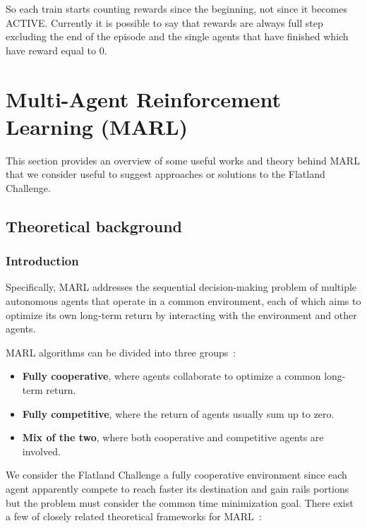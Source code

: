 \documentclass[11pt, a4paper, hidelinks]{report}
\begin{document}
So each train starts counting rewards since the beginning, not since it becomes ACTIVE\@.
Currently it is possible to say that rewards are always full step excluding the end of the episode and the single agents that have finished which have reward equal to 0.

\chapter{Multi-Agent Reinforcement Learning (MARL)}\label{ch:multi-agent-reinforcement-learning}

This section provides an overview of some useful works and theory behind MARL that we consider useful to suggest approaches or solutions to the Flatland Challenge.

\section{Theoretical background}\label{sec:marl-theoretical-background}

\subsection{Introduction}\label{subsec:introduction}

\begin{quoting}[font=itshape, begintext={"}, endtext={"\citep{MARL-definition}}]
Specifically, MARL addresses the sequential decision-making problem of multiple autonomous agents that operate in a common environment, each of which aims to optimize its own long-term return by interacting with the environment and other agents.
\end{quoting}

MARL algorithms can be divided into three groups~\citep{zhang2019multiagent}:

\begin{itemize}
	\item \textbf{Fully cooperative}, where agents collaborate to optimize a common long-term return.
	\item \textbf{Fully competitive}, where the return of agents usually sum up to zero.
	\item \textbf{Mix of the two}, where both cooperative and competitive agents are involved.
\end{itemize}

We consider the Flatland Challenge a fully cooperative environment since each agent apparently compete to reach faster its destination and gain rails portions but the problem must consider the common time minimization goal.
There exist a few of closely related theoretical frameworks for MARL~\citep{zhang2019multiagent}:
\end{document}
